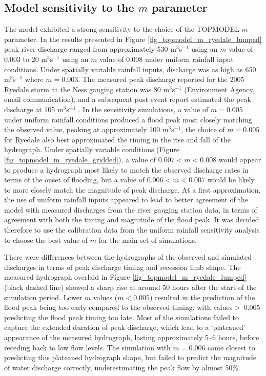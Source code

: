 \subsection{Model sensitivity to the \(m\) parameter}

The model exhibited a strong sensitivity to the choice of the TOPMODEL \(m\) parameter. In the results presented in Figure \ref{fig_topmodel_m_ryedale_lumped} peak river discharge ranged from approximately 530 m\(^3\)s\(^{-1}\) using an \(m\) value of 0.003 to 20 m\(^3\)s\(^{-1}\) using an \(m\) value of 0.008 under uniform rainfall input conditions. Under spatially variable rainfall inputs, discharge was as high as 650 m\(^3\)s\(^{-1}\) where \(m = 0.003\). The measured peak discharge reported for the 2005 Ryedale storm at the Ness gauging station was 80 m\(^3\)s\(^{-1}\) (Environment Agency, email communication), and a subsequent post event report estimated the peak discharge at 105 m\(^3\)s\(^{-1}\) \citep{wass2008investigation}. In the sensitivity simulations, a value of \(m = 0.005\) under uniform rainfall conditions produced a flood peak most closely matching the observed value, peaking at approximately 100 m\(^3\)s\(^{-1}\), the choice of \(m=0.005\) for Ryedale also best approximated the timing in the rise and fall of the hydrograph. Under spatially variable conditions (Figure \ref{fig_topmodel_m_ryedale_gridded}), a value of \(0.007 < m < 0.008\) would appear to produce a hydrograph most likely to match the observed discharge rates in terms of the onset of flooding, but a value of \(0.006 < m < 0.007\) would be likely to more closely match the magnitude of peak discharge. At a first approximation, the use of uniform rainfall inputs appeared to lead to better agreement of the model with measured discharges from the river gauging station data, in terms of agreement with both the timing and magnitude of the flood peak. It was decided therefore to use the calibration data from the uniform rainfall sensitivity analysis to choose the best value of \(m\) for the main set of simulations. 

There were differences between the hydrographs of the observed and simulated discharges in terms of peak discharge timing and recession limb shape. The measured hydrograph overlaid in Figure \ref{fig_topmodel_m_ryedale_lumped} (black dashed line) showed a sharp rise at around 50 hours after the start of the simulation period. Lower \(m\) values (\(m < 0.005\)) resulted in the prediction of the flood peak being too early compared to the observed timing, with values \textgreater \ 0.005 predicting the flood peak timing too late. Most of the simulations failed to capture the extended duration of peak discharge, which lead to a `plateaued' appearance of the measured hydrograph, lasting approximately 5--6 hours, before receding back to low flow levels. The simulation with \(m = 0.006\) came closest to predicting this plateaued hydrograph shape, but failed to predict the magnitude of water discharge correctly, underestimating the peak flow by almost 50\%. 

